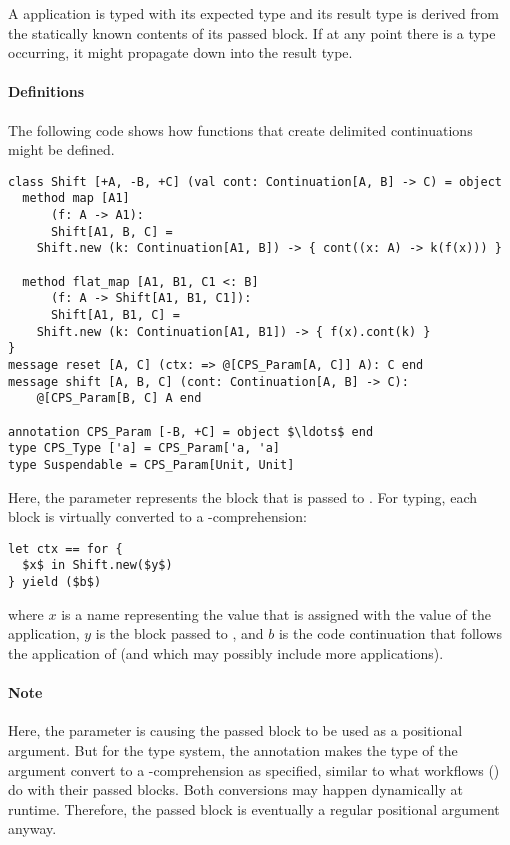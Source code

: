 A  application is typed with its expected type and its result type is derived from the statically known contents of its passed block. If at any point there is a  type occurring, it might propagate down into the result type. 

\paragraph{Definitions}
The following code shows how functions that create delimited continuations might be defined. 
\begin{lstlisting}
class Shift [+A, -B, +C] (val cont: Continuation[A, B] -> C) = object
  method map [A1] 
      (f: A -> A1): 
      Shift[A1, B, C] =
    Shift.new (k: Continuation[A1, B]) -> { cont((x: A) -> k(f(x))) }

  method flat_map [A1, B1, C1 <: B] 
      (f: A -> Shift[A1, B1, C1]): 
      Shift[A1, B1, C] = 
    Shift.new (k: Continuation[A1, B1]) -> { f(x).cont(k) }
}
message reset [A, C] (ctx: => @[CPS_Param[A, C]] A): C end
message shift [A, B, C] (cont: Continuation[A, B] -> C): 
    @[CPS_Param[B, C] A end

annotation CPS_Param [-B, +C] = object $\ldots$ end
type CPS_Type ['a] = CPS_Param['a, 'a]
type Suspendable = CPS_Param[Unit, Unit]
\end{lstlisting}

Here, the  parameter represents the block that is passed to . For typing, each  block is virtually converted to a -comprehension:
\begin{lstlisting}
let ctx == for {
  $x$ in Shift.new($y$)
} yield ($b$)
\end{lstlisting}
where $x$ is a name representing the value that is assigned with the value of the  application, $y$ is the block passed to , and $b$ is the code continuation that follows the application of  (and which may possibly include more  applications). 

\paragraph{Note}
Here, the  parameter is causing the passed block to be used as a positional argument. But for the type system, the annotation  makes the type of the argument convert to a -comprehension as specified, similar to what workflows () do with their passed blocks. Both conversions may happen dynamically at runtime. Therefore, the passed block is eventually a regular positional argument anyway. 

